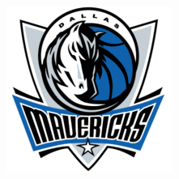 \documentclass[landscape]{article}
\begin{document}
\begin{multicols}{3}
\vspace{-0.3cm}

\begin{center}
	
\end{center}
\begin{minipage}{0.1\linewidth}
	\includegraphics[width=\linewidth]{images/mavs-logo.png}
\end{minipage}
\begin{minipage}{0.9\linewidth}
	
\end{minipage}
\begin{center}
	
\end{center}


\end{multicols}
\end{document}
